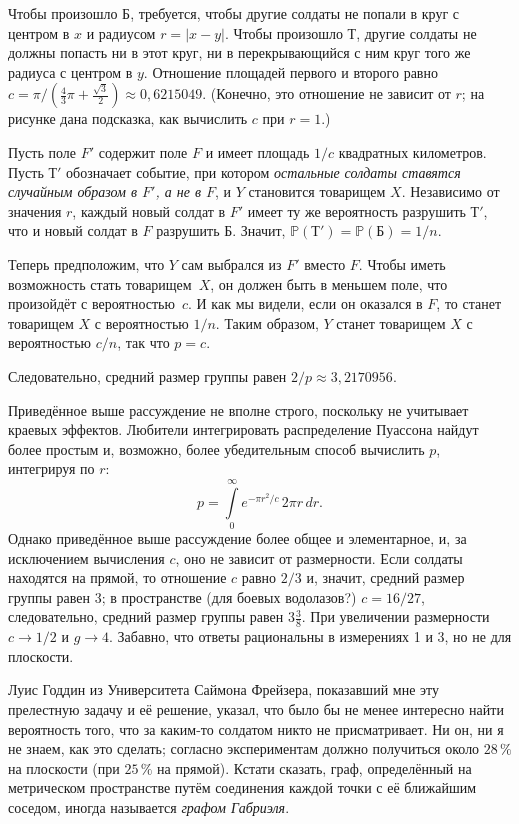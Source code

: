 \documentclass[twoside]{book}
\begin{document}
Чтобы произошло $\text{Б}$, требуется, чтобы другие солдаты не попали в круг с центром в $x$ и радиусом $r=|x-y|$.
Чтобы произошло $\text{Т}$, другие солдаты не должны попасть ни в этот круг, ни в перекрывающийся с ним круг того же радиуса с центром в $y$.
Отношение площадей первого и второго равно $c=\pi/(\tfrac43\pi+\tfrac{\sqrt{3}}{2}) \approx 0{,}6215049$.
(Конечно, это отношение не зависит от $r$; на рисунке дана подсказка, как вычислить $c$ при $r=1$.)

Пусть поле $F'$ содержит поле $F$ и имеет площадь $1/c$ квадратных километров.
Пусть $\text{Т}'$ обозначает событие, при котором \emph{остальные солдаты ставятся случайным образом в $F'$, а не в $F$}, и $Y$ становится товарищем $X$.
Независимо от значения $r$, каждый новый солдат в $F'$ имеет ту же вероятность разрушить $\text{Т}'$, что и новый солдат в $F$ разрушить $\text{Б}$. 
Значит, $\mathbb{P}(\text{Т}')= \mathbb{P}(\text{Б}) = 1/n$.

Теперь предположим, что $Y$ сам выбрался из $F'$ вместо $F$.
Чтобы иметь возможность стать товарищем~$X$, он должен быть в меньшем поле, что произойдёт с вероятностью~$c$.
И как мы видели, если он оказался в $F$, то станет товарищем $X$ с вероятностью $1/n$.
Таким образом, $Y$ станет товарищем $X$ с вероятностью $c/n$, так что $p=c$.

Следовательно, средний размер группы равен $2/p\approx3{,}2170956$.
\heart

Приведённое выше рассуждение не вполне строго, поскольку не учитывает краевых эффектов.
Любители интегрировать распределение Пуассона 
найдут более простым и, возможно, более убедительным способ вычислить $p$, интегрируя по $r$:
\[p=\int\limits_0^\infty e^{-\pi r^2/c}\,2\pi r\, dr.\]
Однако приведённое выше рассуждение более общее и элементарное, и, за исключением вычисления $c$, оно не зависит от размерности.
Если солдаты находятся на прямой, то отношение $c$ равно $2/3$ и, значит, средний размер группы равен 3;
в пространстве (для боевых водолазов?) $c = 16/27$, следовательно, средний размер группы равен $3\tfrac38$.
При увеличении размерности $c\to 1/2$ и $g\to 4$. 
Забавно, что ответы рациональны в измерениях 1 и 3, но не для плоскости.

Луис Годдин из Университета Саймона Фрейзера, показавший мне эту прелестную задачу и её решение, указал, что было бы не менее интересно найти вероятность того, что за каким-то солдатом никто не присматривает.
Ни он, ни я не знаем, как это сделать;
согласно экспериментам должно получиться около $28\,\%$ на плоскости (при $25\,\%$ на прямой).
Кстати сказать, граф, определённый на метрическом пространстве путём соединения каждой точки с её ближайшим соседом, иногда называется \emph{графом Габриэля}.
\end{document}
